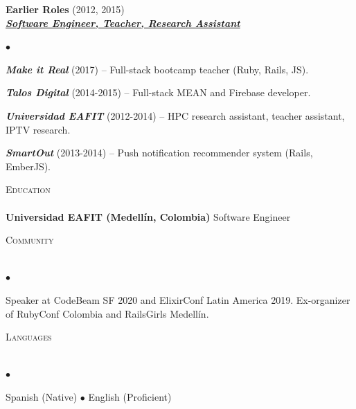 \documentclass[a4paper]{article}
\newcommand{\lineunder}{\vspace*{-8pt} \\ \hspace*{-18pt} \hrulefill \\}
\newcommand{\header}[1]{{\hspace*{-15pt}\vspace*{6pt}
  \textsc{#1}} \vspace*{-6pt} \lineunder}
\newcommand{\employer}[3]{{
  \textbf{#1} (#2)\\ \underline{\textbf{\emph{#3}}}\\ }}
\newenvironment{achievements}{\begin{list}{$\bullet$}{\topsep 0pt \itemsep
  -2pt}}{\vspace*{4pt}\end{list}}
\newcommand{\schoolwithcourses}[2]{
  \textbf{#1} #2
  \vspace*{5pt} }
\newcommand{\emphasys}[1]{\textbf{\emph{#1}}}
\begin{document}
  \employer{ Earlier Roles}{2012, 2015}{Software Engineer, Teacher, Research Assistant}
  \begin{achievements}
  \item \emphasys{Make it Real} (2017) -- Full-stack bootcamp teacher (Ruby, Rails, JS).
  \item \emphasys{Talos Digital} (2014-2015) -- Full-stack MEAN and Firebase developer.
  \item \emphasys{Universidad EAFIT} (2012-2014) -- HPC research assistant, teacher assistant, IPTV research.
  \item \emphasys{SmartOut} (2013-2014) -- Push notification recommender system (Rails, EmberJS).
  \end{achievements}

  \header{Education}
  \schoolwithcourses{Universidad EAFIT (Medell\'in, Colombia)}{Software Engineer}

  \header{Community}
  \begin{achievements}
  \item{Speaker at CodeBeam SF 2020 and ElixirConf Latin America 2019. Ex-organizer of RubyConf Colombia and RailsGirls Medell\'in.}
  \end{achievements}

  \header{Languages}
  \begin{achievements}
  \item{Spanish (Native) $\bullet$ English (Proficient)}
  \end{achievements}
  
\end{document}
